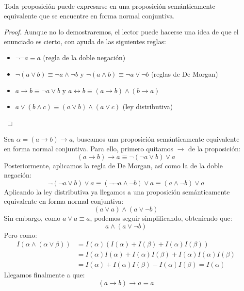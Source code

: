 \begin{prop}
    Toda proposición puede expresarse en una proposición semánticamente equivalente que se encuentre en forma normal conjuntiva.
    \begin{proof}
        Aunque no lo demostraremos, el lector puede hacerse una idea de que el enunciado es cierto, con ayuda de las siguientes reglas:
        \begin{itemize}
            \item $\lnot\lnot a\equiv a$ (regla de la doble negación)
            \item $\lnot(a\lor b) \equiv \lnot a\land\lnot b$ y $\lnot(a\land b) \equiv \lnot a\lor \lnot b$ (reglas de De Morgan)
            \item $a\to b \equiv \lnot a\lor b$ y $a \leftrightarrow b \equiv (a\to b) \land (b\to a)$
            \item $a\lor (b\land c) \equiv (a\lor b) \land (a\lor c)$ (ley distributiva)
        \end{itemize}
    \end{proof}
\end{prop}

\begin{ejemplo}
    Sea $\alpha = (a\to b)\to a$, buscamos una proposición semánticamente equivalente en forma normal conjuntiva. Para ello, primero quitamos $\to$ de la proposición:
    \begin{equation*}
        (a\to b)\to a \equiv \lnot(\lnot a\lor b) \lor a
    \end{equation*}
    Posteriormente, aplicamos la regla de De Morgan, así como la de la doble negación:
    \begin{equation*}
        \lnot(\lnot a\lor b) \lor a \equiv (\lnot\lnot a\land \lnot b) \lor a \equiv (a\land \lnot b)\lor a
    \end{equation*}
    Aplicando la ley distributiva ya llegamos a una proposición semánticamente equivalente en forma normal conjuntiva:
    \begin{equation*}
        (a \lor a) \land (a \lor \lnot b)
    \end{equation*}
    Sin embargo, como $a \lor a \equiv a$, podemos seguir simplificando, obteniendo que:
    \begin{equation*}
        a \land (a \lor \lnot b)
    \end{equation*}
    Pero como:
    \begin{align*}
        I(\alpha \land (\alpha\lor \beta)) &= I(\alpha)(I(\alpha)+I(\beta)+I(\alpha)I(\beta)) \\
                                           &= I(\alpha)I(\alpha) + I(\alpha)I(\beta) + I(\alpha)I(\alpha)I(\beta) \\
                                           &= I(\alpha) + I(\alpha) I(\beta) + I(\alpha)I(\beta) = I(\alpha)
    \end{align*}
    Llegamos finalmente a que:
    \begin{equation*}
        (a\to b)\to a \equiv a
    \end{equation*}
\end{ejemplo}

